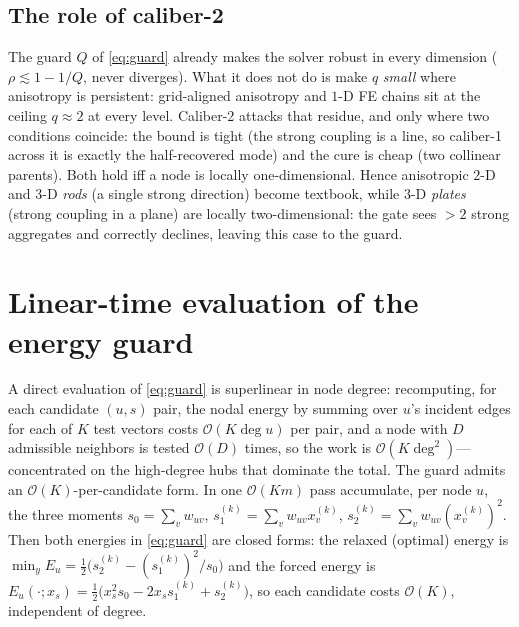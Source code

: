 \documentclass[leqno,letterpaper]{etna}
\begin{document}
\subsection{The role of caliber-2}
The guard $Q$ of \eqref{eq:guard} already makes the solver robust in every
dimension ($\rho\lesssim1-1/Q$, never diverges). What it does not do is make $q$ \emph{small}
where anisotropy is persistent: grid-aligned anisotropy and $1$-D FE chains sit at the ceiling
$q\approx2$ at every level. Caliber-2 attacks that residue, and only where two conditions
coincide: the bound is tight (the strong coupling is a line, so caliber-1 across it is exactly
the half-recovered mode) and the cure is cheap (two collinear parents). Both hold iff a node is
locally one-dimensional. Hence anisotropic $2$-D and $3$-D \emph{rods} (a single strong
direction) become textbook, while $3$-D \emph{plates} (strong coupling in a plane) are locally
two-dimensional: the gate sees $>2$ strong aggregates and correctly declines, leaving this case to the guard.

\section{Linear-time evaluation of the energy guard}\label{sec:guardeval}
A direct evaluation of \eqref{eq:guard} is superlinear in node degree: recomputing, for each candidate
$(u,s)$ pair, the nodal energy by summing over $u$'s incident edges for each of $K$ test
vectors costs $\mathcal{O}(K\deg u)$ per pair, and a node with $D$ admissible neighbors is
tested $\mathcal{O}(D)$ times, so the work is $\mathcal{O}(K\deg^2)$---concentrated on the
high-degree hubs that dominate the total. The guard admits an $\mathcal{O}(K)$-per-candidate
form. In one $\mathcal{O}(Km)$ pass accumulate, per node $u$, the three moments
$s_0=\sum_v w_{uv}$, $s_1^{(k)}=\sum_v w_{uv}x^{(k)}_v$, $s_2^{(k)}=\sum_v w_{uv}(x^{(k)}_v)^2$.
Then both energies in \eqref{eq:guard} are closed forms: the relaxed (optimal) energy is
$\min_y E_u=\tfrac12\big(s_2^{(k)}-(s_1^{(k)})^2/s_0\big)$ and the forced energy is
$E_u(\cdot;x_s)=\tfrac12\big(x_s^2 s_0-2x_s s_1^{(k)}+s_2^{(k)}\big)$, so each candidate costs
$\mathcal{O}(K)$, independent of degree.
\end{document}
